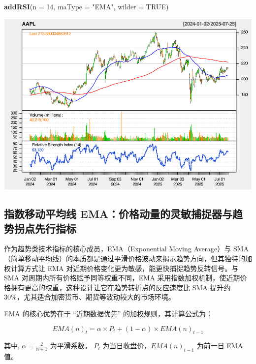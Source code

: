 \documentclass[]{ctexbook}
\newenvironment{Shaded}{\begin{snugshade}}{\end{snugshade}}
\newcommand{\AttributeTok}[1]{\textcolor[rgb]{0.13,0.29,0.53}{#1}}
\newcommand{\ConstantTok}[1]{\textcolor[rgb]{0.56,0.35,0.01}{#1}}
\newcommand{\DecValTok}[1]{\textcolor[rgb]{0.00,0.00,0.81}{#1}}
\newcommand{\FunctionTok}[1]{\textcolor[rgb]{0.13,0.29,0.53}{\textbf{#1}}}
\newcommand{\NormalTok}[1]{#1}
\newcommand{\StringTok}[1]{\textcolor[rgb]{0.31,0.60,0.02}{#1}}
\begin{document}
\begin{Shaded}
\begin{Highlighting}[]
\FunctionTok{addRSI}\NormalTok{(}\AttributeTok{n =} \DecValTok{14}\NormalTok{, }\AttributeTok{maType =} \StringTok{"EMA"}\NormalTok{, }\AttributeTok{wilder =} \ConstantTok{TRUE}\NormalTok{)}
\end{Highlighting}
\end{Shaded}

\includegraphics[width=0.9\linewidth]{QuantmodHandbook_files/figure-latex/sma_2-4}

\subsection{指数移动平均线 EMA：价格动量的灵敏捕捉器与趋势拐点先行指标}\label{ux6307ux6570ux79fbux52a8ux5e73ux5747ux7ebf-emaux4ef7ux683cux52a8ux91cfux7684ux7075ux654fux6355ux6349ux5668ux4e0eux8d8bux52bfux62d0ux70b9ux5148ux884cux6307ux6807}

作为趋势类技术指标的核心成员，EMA（Exponential Moving Average）与 SMA（简单移动平均线）的本质都是通过平滑价格波动来揭示趋势方向，但其独特的加权计算方式让 EMA 对近期价格变化更为敏感，能更快捕捉趋势反转信号。与 SMA 对周期内所有价格赋予同等权重不同，EMA 采用指数加权机制，使近期价格拥有更高的权重，这种设计让它在趋势转折点的反应速度比 SMA 提升约 30\%，尤其适合加密货币、期货等波动较大的市场环境。

EMA 的核心优势在于 ``近期数据优先'' 的加权规则，其计算公式为：

\[
EMA(n)_t = \alpha \times P_t + (1-\alpha) \times EMA(n)_{t-1} 
\]

其中, \(\alpha = \frac{2}{n+1}\) 为平滑系数， \(P_t\) 为当日收盘价，\(EMA(n)_{t-1}\) 为前一日 EMA 值。
\end{document}
